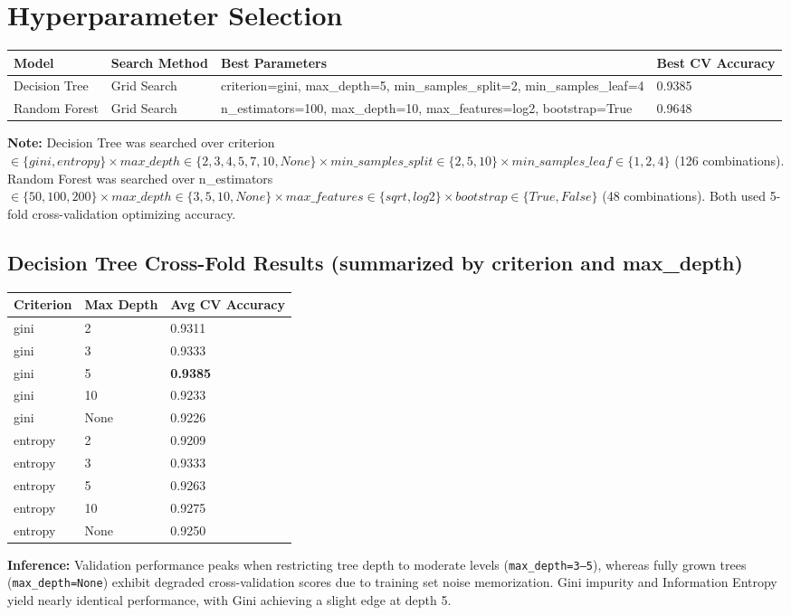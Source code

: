 \documentclass[12pt,a4paper]{article}
\begin{document}
\section{Hyperparameter Selection}

\begin{longtable}{|p{3.2cm}|p{2.6cm}|p{5.5cm}|p{2.3cm}|}
\hline
\textbf{Model} & \textbf{Search Method} & \textbf{Best Parameters} & \textbf{Best CV Accuracy} \\ \hline
\endhead
Decision Tree & Grid Search & criterion=gini, max\_depth=5, min\_samples\_split=2, min\_samples\_leaf=4 & 0.9385 \\ \hline
Random Forest & Grid Search & n\_estimators=100, max\_depth=10, max\_features=log2, bootstrap=True & 0.9648 \\ \hline
\end{longtable}

\textbf{Note:} Decision Tree was searched over criterion $\in \{gini, entropy\} \times
max\_depth \in \{2,3,4,5,7,10,None\} \times min\_samples\_split \in \{2,5,10\} \times
min\_samples\_leaf \in \{1,2,4\}$ (126 combinations). Random Forest was searched over
n\_estimators $\in \{50,100,200\} \times max\_depth \in \{3,5,10,None\} \times max\_features
\in \{sqrt, log2\} \times bootstrap \in \{True, False\}$ (48 combinations). Both used 5-fold
cross-validation optimizing accuracy.

\subsection*{Decision Tree Cross-Fold Results (summarized by criterion and max\_depth)}
\begin{longtable}{|p{3cm}|p{3cm}|p{3.5cm}|}
\hline
\textbf{Criterion} & \textbf{Max Depth} & \textbf{Avg CV Accuracy} \\ \hline
\endhead
gini & 2 & 0.9311 \\ \hline
gini & 3 & 0.9333 \\ \hline
gini & 5 & \textbf{0.9385} \\ \hline
gini & 10 & 0.9233 \\ \hline
gini & None & 0.9226 \\ \hline
entropy & 2 & 0.9209 \\ \hline
entropy & 3 & 0.9333 \\ \hline
entropy & 5 & 0.9263 \\ \hline
entropy & 10 & 0.9275 \\ \hline
entropy & None & 0.9250 \\ \hline
\end{longtable}
\textbf{Inference:} Validation performance peaks when restricting tree depth to moderate levels (\texttt{max\_depth=3--5}), whereas fully grown trees (\texttt{max\_depth=None}) exhibit degraded cross-validation scores due to training set noise memorization. Gini impurity and Information Entropy yield nearly identical performance, with Gini achieving a slight edge at depth 5.
\end{document}
